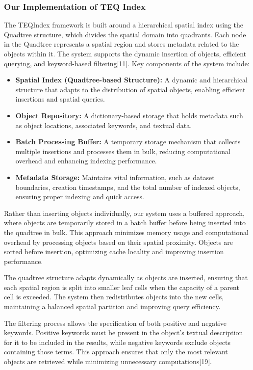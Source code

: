\documentclass[conference]{IEEEtran}
\begin{document}
\subsubsection{\textbf{Our Implementation of TEQ Index}}
The TEQIndex framework is built around a hierarchical spatial index using the Quadtree structure, which divides the spatial domain into quadrants. Each node in the Quadtree represents a spatial region and stores metadata related to the objects within it. The system supports the dynamic insertion of objects, efficient querying, and keyword-based filtering[11]. Key components of the system include:
\begin{itemize}
    \item \textbf{Spatial Index (Quadtree-based Structure):} A dynamic and hierarchical structure that adapts to the distribution of spatial objects, enabling efficient insertions and spatial queries.
    \item \textbf{Object Repository:} A dictionary-based storage that holds metadata such as object locations, associated keywords, and textual data.
    \item \textbf{Batch Processing Buffer:} A temporary storage mechanism that collects multiple insertions and processes them in bulk, reducing computational overhead and enhancing indexing performance.
    \item \textbf{Metadata Storage:} Maintains vital information, such as dataset boundaries, creation timestamps, and the total number of indexed objects, ensuring proper indexing and quick access.
\end{itemize}
 
 Rather than inserting objects individually, our system uses a buffered approach, where objects are temporarily stored in a batch buffer before being inserted into the quadtree in bulk. This approach minimizes memory usage and computational overhead by processing objects based on their spatial proximity. Objects are sorted before insertion, optimizing cache locality and improving insertion performance.

The quadtree structure adapts dynamically as objects are inserted, ensuring that each spatial region is split into smaller leaf cells when the capacity of a parent cell is exceeded. The system then redistributes objects into the new cells, maintaining a balanced spatial partition and improving query efficiency.

The filtering process allows the specification of both positive and negative keywords. Positive keywords must be present in the object's textual description for it to be included in the results, while negative keywords exclude objects containing those terms. This approach ensures that only the most relevant objects are retrieved while minimizing unnecessary computations[19].
\end{document}
